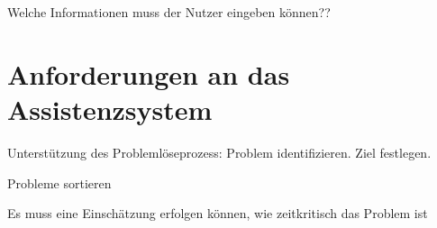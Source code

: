 Welche Informationen muss der Nutzer eingeben können??

\section{Anforderungen an das Assistenzsystem}

Unterstützung des Problemlöseprozess: Problem identifizieren. Ziel festlegen.

Probleme sortieren

Es muss eine Einschätzung erfolgen können, wie zeitkritisch das Problem ist

